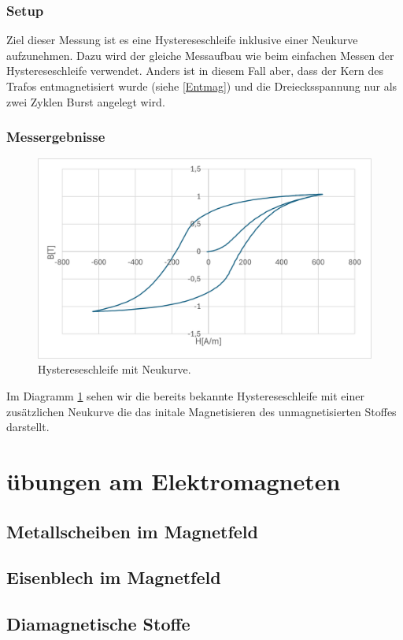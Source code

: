 \documentclass[a4paper,twoside,12pt,DIV=13,BCOR=5mm,numbers=noenddot,cleardoublepage=empty]{scrbook}
\begin{document}
\subsection{Setup}
Ziel dieser Messung ist es eine Hystereseschleife inklusive einer Neukurve aufzunehmen. 
Dazu wird der gleiche Messaufbau wie beim einfachen Messen der Hystereseschleife verwendet. Anders ist in diesem Fall aber, dass der Kern des Trafos entmagnetisiert wurde (siehe \ref{Entmag}) und 
die Dreiecksspannung nur als zwei Zyklen Burst angelegt wird.
\subsection{Messergebnisse}
\begin{figure}
  \includegraphics[width=\linewidth]{pictures/Neukurve.png}
  \caption{Hystereseschleife mit Neukurve.}
  \label{fig:neukurve}
\end{figure}
Im Diagramm \ref{fig:neukurve} sehen wir die bereits bekannte Hystereseschleife mit einer zus\"atzlichen Neukurve die das initale Magnetisieren des unmagnetisierten Stoffes darstellt.
\chapter{\"ubungen am Elektromagneten}
\section{Metallscheiben im Magnetfeld}

\section{Eisenblech im Magnetfeld}

\section{Diamagnetische Stoffe}
\end{document}
